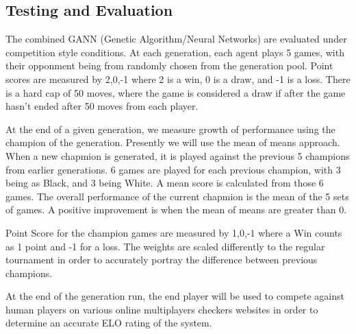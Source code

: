 \documentclass[12pt,a4paper]{article}
\begin{document}
\subsection*{Testing and Evaluation}

    The combined GANN (Genetic Algorithm/Neural Networks) are evaluated under competition style conditions. At each generation, each agent plays 5 games, with their opponment being from randomly chosen from the generation pool. Point scores are measured by {2,0,-1} where 2 is a win, 0 is a draw, and -1 is a loss. There is a hard cap of 50 moves, where the game is considered a draw if after the game hasn't ended after 50 moves from each player.

    At the end of a given generation, we measure growth of performance using the champion of the generation. Presently we will use the mean of means approach. When a new chapmion is generated, it is played against the previous 5 champions from earlier generations. 6 games are played for each previous champion, with 3 being as Black, and 3 being White. A mean score is calculated from those 6 games. The overall performance of the current chapmion is the mean of the 5 sets of games. A positive improvement is when the mean of means are greater than 0. 

    Point Score for the champion games are measured by {1,0,-1} where a Win counts as 1 point and -1 for a loss. The weights are scaled differently to the regular tournament in order to accurately portray the difference between previous champions.

    At the end of the generation run, the end player will be used to compete against human players on various online multiplayers checkers websites in order to determine an accurate ELO rating of the system.





\end{document}
